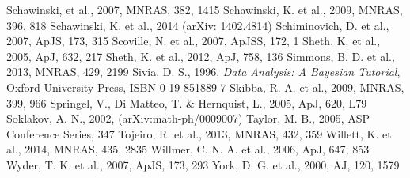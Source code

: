 \documentclass[useAMS,usenatbib]{mn2e}
\begin{document}
\begin{thebibliography}{}
 Schawinski, et al., 2007, MNRAS, 382, 1415
 Schawinski, K. et al., 2009, MNRAS, 396, 818
 Schawinski, K. et al., 2014 (arXiv: 1402.4814)
 Schiminovich, D. et al., 2007, ApJS, 173, 315
 Scoville, N. et al., 2007, ApJSS, 172, 1
 Sheth, K. et al., 2005, ApJ, 632, 217
 Sheth, K. et al., 2012, ApJ, 758, 136
 Simmons, B. D. et al., 2013, MNRAS, 429, 2199
 Sivia, D. S., 1996, \emph{Data Analysis: A Bayesian Tutorial}, Oxford University Press, ISBN 0-19-851889-7
 Skibba, R. A. et al., 2009, MNRAS, 399, 966
 Springel, V., Di Matteo, T. \& Hernquist, L., 2005, ApJ, 620, L79
 Soklakov, A. N., 2002, (arXiv:math-ph/0009007)
 Taylor, M. B., 2005, ASP Conference Series, 347
 Tojeiro, R. et al., 2013, MNRAS, 432, 359
 Willett, K. et al., 2014, MNRAS, 435, 2835
 Willmer, C. N. A. et al., 2006, ApJ, 647, 853
 Wyder, T. K. et al., 2007, ApJS, 173, 293
 York, D. G. et al., 2000, AJ, 120, 1579
\end{thebibliography}{}



%
\end{document}
